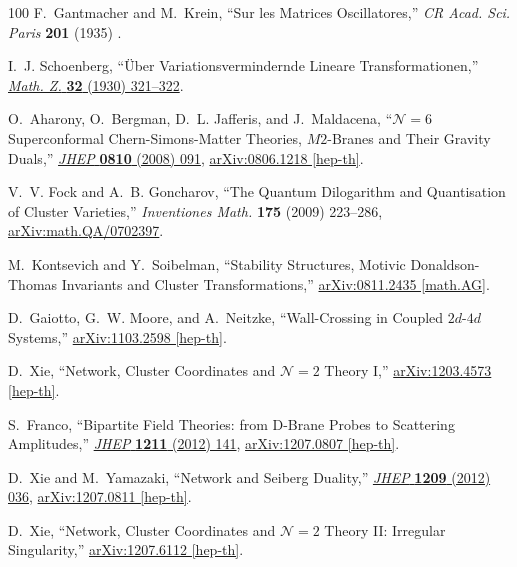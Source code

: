 \documentclass[12pt,hyperref,compress]{JHEP3}
\begin{document}
\begin{thebibliography}{100}
F.~Gantmacher and M.~Krein, ``{Sur les Matrices Oscillatores},'' {\em CR Acad.
  Sci. Paris} {\bf 201} (1935)  .

I.~J. Schoenberg, ``{\"{U}ber Variationsvermindernde Lineare
  Transformationen},'' \href{http://dx.doi.org/10.1007/BF01194637}{{\em Math.
  Z.} {\bf 32} (1930)  321--322}.

O.~Aharony, O.~Bergman, D.~L. Jafferis, and J.~Maldacena,
  ``{$\mathcal{N}\!=\!6$ Superconformal Chern-Simons-Matter Theories,
  $M2$-Branes and Their Gravity Duals},''
  \href{http://dx.doi.org/10.1088/1126-6708/2008/10/091}{{\em JHEP} {\bf 0810}
  (2008)  091},
\href{http://arxiv.org/abs/0806.1218}{{ arXiv:0806.1218 [hep-th]}}.

V.~V. Fock and A.~B. Goncharov, ``{The Quantum Dilogarithm and Quantisation of
  Cluster Varieties},'' {\em Inventiones Math.} {\bf 175} (2009)  223--286,
  \href{http://arxiv.org/abs/math.QA/0702397}{{ arXiv:math.QA/0702397}}.

M.~Kontsevich and Y.~Soibelman, ``{Stability Structures, Motivic
  Donaldson-Thomas Invariants and Cluster Transformations},''
  \href{http://arxiv.org/abs/0811.2435}{{ arXiv:0811.2435 [math.AG]}}.

D.~Gaiotto, G.~W. Moore, and A.~Neitzke, ``{Wall-Crossing in Coupled $2d$-$4d$
  Systems},''
\href{http://arxiv.org/abs/1103.2598}{{ arXiv:1103.2598 [hep-th]}}.

D.~Xie, ``{Network, Cluster Coordinates and $\mathcal{N}\!=\!2$ Theory I},''
\href{http://arxiv.org/abs/1203.4573}{{ arXiv:1203.4573 [hep-th]}}.

S.~Franco, ``{Bipartite Field Theories: from D-Brane Probes to Scattering
  Amplitudes},'' \href{http://dx.doi.org/10.1007/JHEP11(2012)141}{{\em JHEP}
  {\bf 1211} (2012)  141},
\href{http://arxiv.org/abs/1207.0807}{{ arXiv:1207.0807 [hep-th]}}.

D.~Xie and M.~Yamazaki, ``{Network and Seiberg Duality},''
  \href{http://dx.doi.org/10.1007/JHEP09(2012)036}{{\em JHEP} {\bf 1209} (2012)
   036},
\href{http://arxiv.org/abs/1207.0811}{{ arXiv:1207.0811 [hep-th]}}.

D.~Xie, ``{Network, Cluster Coordinates and $\mathcal{N}\!=\!2$ Theory II:
  Irregular Singularity},''
\href{http://arxiv.org/abs/1207.6112}{{ arXiv:1207.6112 [hep-th]}}.


\end{thebibliography}
\end{document}

